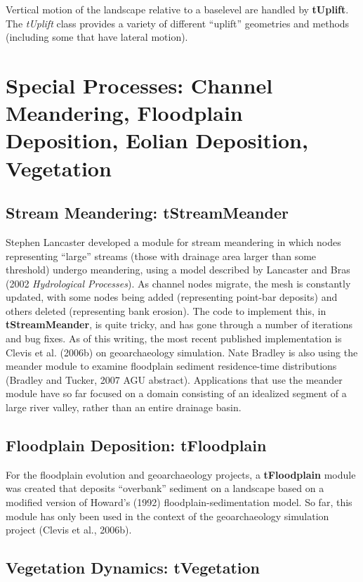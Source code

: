 \documentclass[12pt]{article}
\begin{document}
Vertical motion of the landscape relative to a baselevel are handled by
{\bf tUplift}. The {\em tUplift} class provides a variety of different 
``uplift'' geometries and methods (including some that have lateral motion).

\section{Special Processes: Channel Meandering, Floodplain Deposition, Eolian Deposition, Vegetation}

\subsection{Stream Meandering: tStreamMeander}

Stephen Lancaster developed a module for stream meandering in which nodes 
representing ``large'' streams (those with drainage area larger than some
threshold) undergo meandering, using a model described by Lancaster and
Bras (2002 {\em Hydrological Processes}). As channel nodes migrate, the mesh is constantly updated, with
some nodes being added (representing point-bar deposits) and others deleted
(representing bank erosion). The code to implement this, in
 {\bf tStreamMeander}, is quite tricky, and
has gone through a number of iterations and bug fixes. As of this writing, the
most recent published implementation is Clevis et al. (2006b) on geoarchaeology
simulation. Nate Bradley is also using the meander module to examine 
floodplain sediment residence-time distributions (Bradley and Tucker, 2007
AGU abstract). Applications that use the meander module have so far focused on 
a domain
consisting of an idealized segment of a large river valley, rather than an
entire drainage basin.

\subsection{Floodplain Deposition: tFloodplain}

For the floodplain evolution and geoarchaeology projects, a {\bf tFloodplain}
module was created that deposits ``overbank'' sediment on a landscape based on
a modified version of Howard's (1992) floodplain-sedimentation model. So far,
this module has only been used in the context of the geoarchaeology simulation
project (Clevis et al., 2006b).

\subsection{Vegetation Dynamics: tVegetation}
\end{document}
